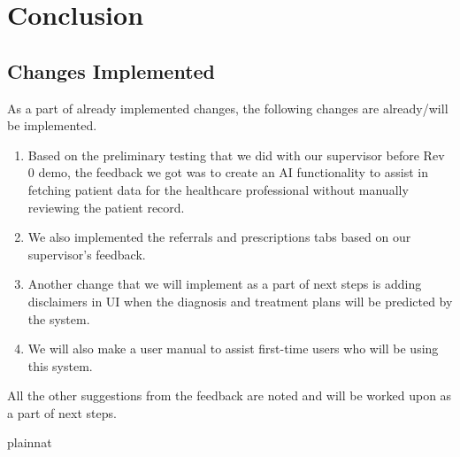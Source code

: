 \documentclass{article}
\begin{document}
\newpage

\section{Conclusion}

\subsection{Changes Implemented}

As a part of already implemented changes, the following changes are already/will be implemented.

\begin{enumerate}
    \item Based on the preliminary testing that we did with our supervisor before Rev 0 demo, the feedback we got was to create an AI functionality to assist in fetching patient data for the healthcare professional without manually reviewing the patient record.
    \item We also implemented the referrals and prescriptions tabs based on our supervisor's feedback.
    \item Another change that we will implement as a part of next steps is adding disclaimers in UI when the diagnosis and treatment plans will be predicted by the system.
    \item We will also make a user manual to assist first-time users who will be using this system.
\end{enumerate}

All the other suggestions from the feedback are noted and will be worked upon as a part of next steps.

\newpage

 {plainnat}

\end{document}
